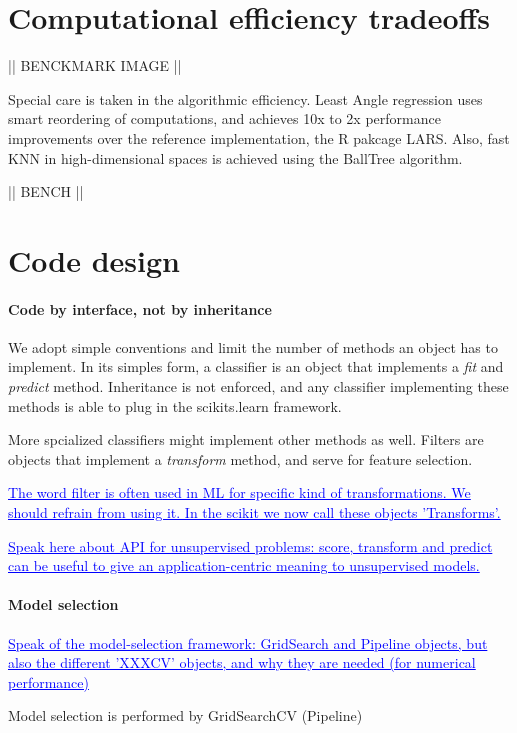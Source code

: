 \documentclass[twoside,11pt]{article}
\newcommand{\GAEL}[1]{\textcolor{blue}{\uline{#1}}}
\begin{document}
\section{Computational efficiency tradeoffs}

|| BENCKMARK IMAGE ||


Special care is taken in the algorithmic efficiency. Least Angle
regression uses smart reordering of computations, and achieves 10x to
2x performance improvements over the reference implementation, the R
pakcage LARS. Also, fast KNN in high-dimensional spaces is achieved
using the BallTree algorithm.

|| BENCH ||

\section{Code design}

\paragraph{Code by interface, not by inheritance}
%
We adopt simple conventions and limit the number of methods an object
has to implement. In its simples form, a classifier is an object that
implements a \emph{fit} and \emph{predict} method. Inheritance is not
enforced, and any classifier implementing these methods is able to
plug in the scikits.learn framework.


More spcialized classifiers might implement other methods as
well. Filters are objects that implement a \emph{transform} method,
and serve for feature selection.

\GAEL{The word filter is often used in ML for specific kind of
transformations. We should refrain from using it. In the scikit we now
call these objects 'Transforms'. }

\GAEL{Speak here about API for unsupervised problems: score, transform and
predict can be useful to give an application-centric meaning to
unsupervised models.}

\paragraph{Model selection}

\GAEL{Speak of the model-selection framework: GridSearch and Pipeline
objects, but also the different 'XXXCV' objects, and why they are needed
(for numerical performance)}

Model selection is performed by GridSearchCV (Pipeline)
\end{document}
